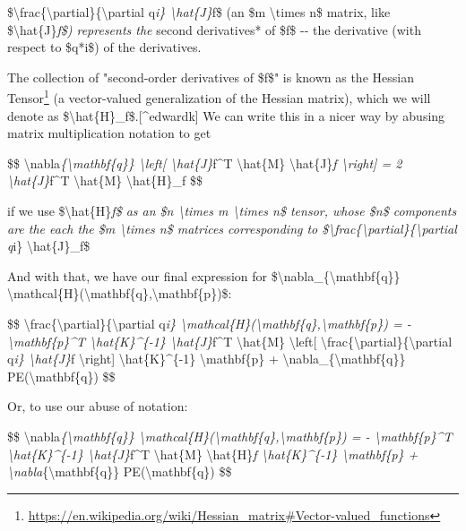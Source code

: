 \documentclass[]{article}
\renewcommand{\href}[2]{#2\footnote{\url{#1}}}
\begin{document}
\$\textbackslash{}frac\{\textbackslash{}partial\}\{\textbackslash{}partial
q\emph{i\} \textbackslash{}hat\{J\}}f\$ (an \$m \textbackslash{}times n\$
matrix, like \$\textbackslash{}hat\{J\}\emph{f\$) represents the }second
derivatives* of \$f\$ -\/- the derivative (with respect to \$q*i\$) of the
derivatives.

The collection of "second-order derivatives of \$f\$" is known as the
\href{https://en.wikipedia.org/wiki/Hessian_matrix\#Vector-valued_functions}{Hessian
Tensor} (a vector-valued generalization of the Hessian matrix), which we will
denote as \$\textbackslash{}hat\{H\}\_f\$.{[}\^{}edwardk{]} We can write this in
a nicer way by abusing matrix multiplication notation to get

\$\$ \textbackslash{}nabla\emph{\{\textbackslash{}mathbf\{q\}\}
\textbackslash{}left{[} \textbackslash{}hat\{J\}}f\^{}T \textbackslash{}hat\{M\}
\textbackslash{}hat\{J\}\emph{f \textbackslash{}right{]} = 2
\textbackslash{}hat\{J\}}f\^{}T \textbackslash{}hat\{M\}
\textbackslash{}hat\{H\}\_f \$\$

if we use \$\textbackslash{}hat\{H\}\emph{f\$ as an \$n \textbackslash{}times m
\textbackslash{}times n\$ tensor, whose \$n\$ components are the each the \$m
\textbackslash{}times n\$ matrices corresponding to
\$\textbackslash{}frac\{\textbackslash{}partial\}\{\textbackslash{}partial q}i\}
\textbackslash{}hat\{J\}\_f\$

And with that, we have our final expression for
\$\textbackslash{}nabla\_\{\textbackslash{}mathbf\{q\}\}
\textbackslash{}mathcal\{H\}(\textbackslash{}mathbf\{q\},\textbackslash{}mathbf\{p\})\$:

\$\$ \textbackslash{}frac\{\textbackslash{}partial\}\{\textbackslash{}partial
q\emph{i\}
\textbackslash{}mathcal\{H\}(\textbackslash{}mathbf\{q\},\textbackslash{}mathbf\{p\})
= - \textbackslash{}mathbf\{p\}\^{}T \textbackslash{}hat\{K\}\^{}\{-1\}
\textbackslash{}hat\{J\}}f\^{}T \textbackslash{}hat\{M\} \textbackslash{}left{[}
\textbackslash{}frac\{\textbackslash{}partial\}\{\textbackslash{}partial
q\emph{i\} \textbackslash{}hat\{J\}}f \textbackslash{}right{]}
\textbackslash{}hat\{K\}\^{}\{-1\} \textbackslash{}mathbf\{p\} +
\textbackslash{}nabla\_\{\textbackslash{}mathbf\{q\}\}
PE(\textbackslash{}mathbf\{q\}) \$\$

Or, to use our abuse of notation:

\$\$ \textbackslash{}nabla\emph{\{\textbackslash{}mathbf\{q\}\}
\textbackslash{}mathcal\{H\}(\textbackslash{}mathbf\{q\},\textbackslash{}mathbf\{p\})
= - \textbackslash{}mathbf\{p\}\^{}T \textbackslash{}hat\{K\}\^{}\{-1\}
\textbackslash{}hat\{J\}}f\^{}T \textbackslash{}hat\{M\}
\textbackslash{}hat\{H\}\emph{f \textbackslash{}hat\{K\}\^{}\{-1\}
\textbackslash{}mathbf\{p\} +
\textbackslash{}nabla}\{\textbackslash{}mathbf\{q\}\}
PE(\textbackslash{}mathbf\{q\}) \$\$
\end{document}
